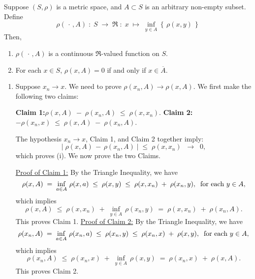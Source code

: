 \begin{lemma}\label{LemmaRho}
\quad
Suppose $\left(S,\rho\right)$ is a metric space, and $A \subset S$ is an arbitrary non-empty subset.
Define
\begin{equation*}
\rho(\,\cdot\,,A) \;:\; S \;\longrightarrow\; \Re \;:\; x \;\longmapsto\; \inf_{y\in A}\left\{\,\rho(x,y)\,\right\}
\end{equation*}
Then,
\begin{enumerate}
\item	$\rho(\,\cdot\,,A)$ is a continuous $\Re$-valued function on $S$.
\item	For each $x \in S$, $\rho(x,A) = 0$ if and only if $x \in \overline{A}$.
\end{enumerate}
\end{lemma}
\proof
\begin{enumerate}
\item
	Suppose $x_{n} \longrightarrow x$. We need to prove $\rho(x_{n},A) \longrightarrow \rho(x,A)$.
	We first make the following two claims:

	\vskip 0.5cm
	\begin{center}
	\begin{minipage}{6.0in}
	\noindent
	\textbf{Claim 1:}\quad$\rho(x,A) \;-\; \rho(x_{n},A) \;\leq\; \rho(x,x_{n})$.
	\vskip 0.2cm
	\textbf{Claim 2:}\quad$- \rho(x_{n},x) \;\leq\; \rho(x,A) \;-\; \rho(x_{n},A)$.
	\end{minipage}
	\end{center}

	\vskip 0.1cm
	\noindent
	The hypothesis $x_{n} \longrightarrow x$, Claim 1, and Claim 2 together imply:
	\begin{equation*}
	\left\vert\;\rho(x,A) \,-\, \rho(x_{n},A)\;\right\vert \; \leq \; \rho(x,x_{n})
	\;\;\longrightarrow\;\;0,
	\end{equation*}
	which proves (i). We now prove the two Claims.

	\vskip 0.2cm
	\noindent
	\underline{Proof of Claim 1:}\quad
	By the Triangle Inequality, we have
	\begin{equation*}
	\rho(x,A) \;=\; \inf_{a \in A}\,\rho(x,a) \;\leq\; \rho(x,y) \;\leq\; \rho(x,x_{n}) \;+\; \rho(x_{n},y),
	\;\;\textnormal{for each $y \in A$},
	\end{equation*}
	which implies
	\begin{equation*}
	\rho(x,A) \;\leq\; \rho(x,x_{n}) \;+\; \inf_{y \in A}\,\rho(x_{n},y) \;=\; \rho(x,x_{n}) \;+\; \rho(x_{n},A).
	\end{equation*}
	This proves Claim 1.
	\vskip 0.5cm
	\noindent
	\underline{Proof of Claim 2:}\quad
	By the Triangle Inequality, we have
	\begin{equation*}
	\rho(x_{n},A) \;=\; \inf_{a \in A}\,\rho(x_{n},a) \;\leq\; \rho(x_{n},y) \;\leq\; \rho(x_{n},x) \;+\; \rho(x,y),
	\;\;\textnormal{for each $y \in A$},
	\end{equation*}
	which implies
	\begin{equation*}
	\rho(x_{n},A) \;\leq\; \rho(x_{n},x) \;+\; \inf_{y \in A}\,\rho(x,y) \;=\; \rho(x_{n},x) \;+\; \rho(x,A).
	\end{equation*}
	This proves Claim 2.


\end{enumerate}
